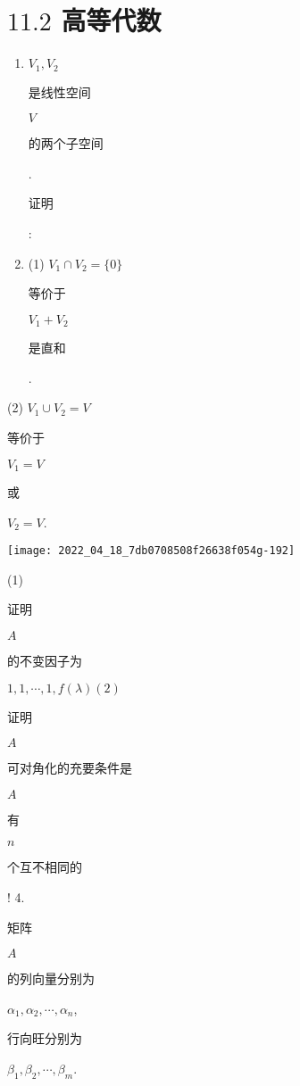 \documentclass[10pt]{article}
\begin{document}
\section{$11.2$ 高等代数}
\begin{enumerate}
  \item $V_{1}, V_{2}$ \begin{CJK}{UTF8}{mj}是线性空间\end{CJK} $V$ \begin{CJK}{UTF8}{mj}的两个子空间\end{CJK}. \begin{CJK}{UTF8}{mj}证明\end{CJK}:

  \item (1) $V_{1} \cap V_{2}=\{0\}$ \begin{CJK}{UTF8}{mj}等价于\end{CJK} $V_{1}+V_{2}$ \begin{CJK}{UTF8}{mj}是直和\end{CJK}.

\end{enumerate}
(2) $V_{1} \cup V_{2}=V$ \begin{CJK}{UTF8}{mj}等价于\end{CJK} $V_{1}=V$ \begin{CJK}{UTF8}{mj}或\end{CJK} $V_{2}=V$.

\texttt{[image: 2022\_04\_18\_7db0708508f26638f054g-192]}

(1) \begin{CJK}{UTF8}{mj}证明\end{CJK} $A$ \begin{CJK}{UTF8}{mj}的不变因子为\end{CJK} $1,1, \cdots, 1, f(\lambda)(2)$ \begin{CJK}{UTF8}{mj}证明\end{CJK} $A$ \begin{CJK}{UTF8}{mj}可对角化的充要条件是\end{CJK} $A$ \begin{CJK}{UTF8}{mj}有\end{CJK} $n$ \begin{CJK}{UTF8}{mj}个互不相同的\end{CJK}! 4. \begin{CJK}{UTF8}{mj}矩阵\end{CJK} $A$ \begin{CJK}{UTF8}{mj}的列向量分别为\end{CJK} $\alpha_{1}, \alpha_{2}, \cdots, \alpha_{n}$, \begin{CJK}{UTF8}{mj}行向旺分别为\end{CJK} $\beta_{1}, \beta_{2}, \cdots, \beta_{m}$.
\end{document}
